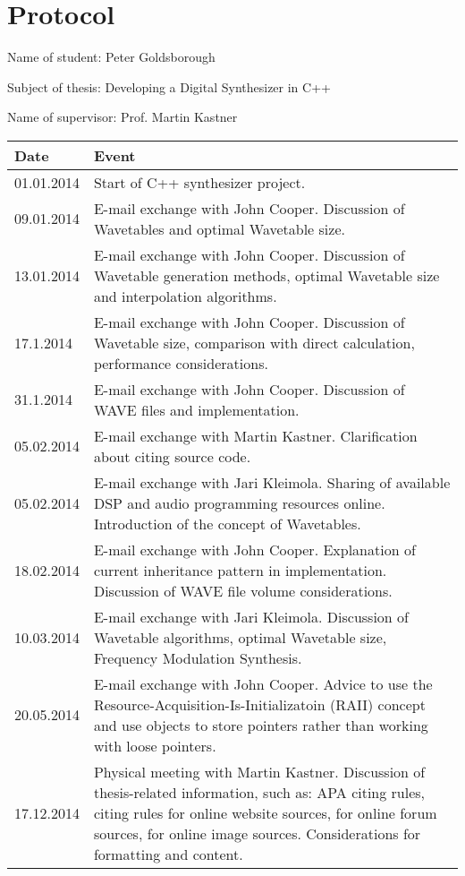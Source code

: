 \chapter*{Protocol}

Name of student: Peter Goldsborough \parbreak

Subject of thesis: Developing a Digital Synthesizer in C++ \parbreak

Name of supervisor: Prof. Martin Kastner \parbreak

\begin{tabular}{| p{2cm} | p{13cm} |}
  \hline
  \rowcolor[gray]{0.8}
  Date & Event \\
  \hline
  01.01.2014 & Start of C++ synthesizer project. \\
  \hline
  09.01.2014 & E-mail exchange with John Cooper. Discussion of Wavetables and optimal Wavetable size. \\
  \hline
  13.01.2014 & E-mail exchange with John Cooper. Discussion of Wavetable generation methods, optimal Wavetable size and interpolation algorithms. \\
  \hline
  17.1.2014 & E-mail exchange with John Cooper. Discussion of Wavetable size, comparison with direct calculation, performance considerations. \\
  \hline
  31.1.2014 & E-mail exchange with John Cooper. Discussion of WAVE files and implementation. \\
  \hline
  05.02.2014 & E-mail exchange with Martin Kastner. Clarification about citing source code. \\
  \hline
  05.02.2014 & E-mail exchange with Jari Kleimola. Sharing of available DSP and audio programming resources online. Introduction of the concept of Wavetables. \\
  \hline
  18.02.2014 & E-mail exchange with John Cooper. Explanation of current inheritance pattern in implementation. Discussion of WAVE file volume considerations. \\
  \hline
  10.03.2014 & E-mail exchange with Jari Kleimola. Discussion of Wavetable algorithms, optimal Wavetable size, Frequency Modulation Synthesis. \\
  \hline
  20.05.2014 & E-mail exchange with John Cooper. Advice to use the Resource-Acquisition-Is-Initializatoin (RAII) concept and use objects to store pointers rather than working with loose pointers. \\
  \hline
  17.12.2014 & Physical meeting with Martin Kastner. Discussion of thesis-related information, such as: APA citing rules, citing rules for online website sources, for online forum sources, for online image sources. Considerations for formatting and content. \\

\end{tabular}
